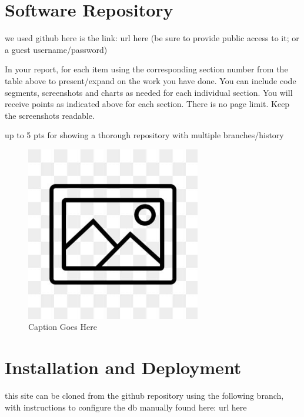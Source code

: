 \documentclass[12pt, letterpaper]{article}
\begin{document}
 \newpage

\section{Software Repository}
we used github here is the link: url here (be sure to provide public access to it; or a guest username/password)

In your report, for each item using the corresponding section number from the table above to present/expand on the work you have done. You can include code segments, screenshots and charts as needed for each individual section. You will receive points as indicated above for each section. There is no page limit. Keep the screenshots readable.

up to 5 pts for showing a thorough repository with multiple branches/history

\begin{figure}[htbp]
	\centering
	\includegraphics[width=3in]{images/placeholder.jpg}
	\caption{Caption Goes Here}
 \end{figure}

 \newpage

\section{Installation and Deployment}
this site can be cloned from the github repository using the following branch, with instructions to configure the db manually found here: url here
\end{document}
